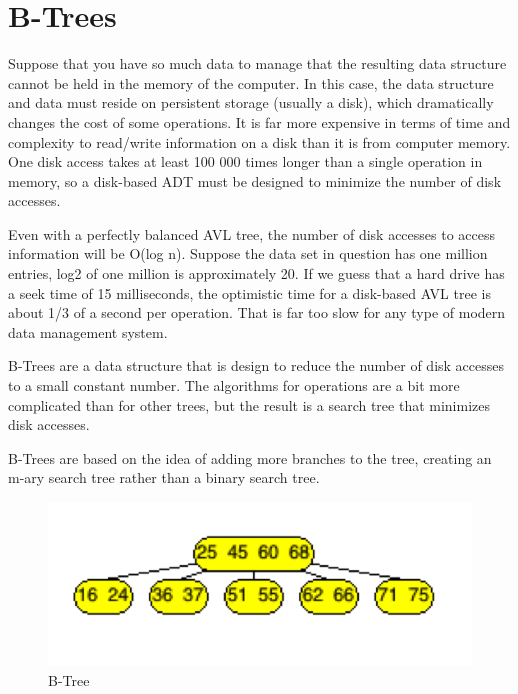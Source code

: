 \section{B-Trees}

Suppose that you have so much data to manage that the resulting data structure cannot be held in the memory of the computer. In this case, the data structure and data must reside on persistent storage (usually a disk), which dramatically changes the cost of some operations. It is far more expensive in terms of time and complexity to read/write information on a disk than it is from computer memory. One disk access takes at least 100 000 times longer than a single operation in memory, so a disk-based ADT must be designed to minimize the number of disk accesses.

Even with a perfectly balanced AVL tree, the number of disk accesses to access information will be O(log n). Suppose the data set in question has one million entries, log2 of one million is approximately 20. If we guess that a hard drive has a seek time of 15 milliseconds, the optimistic time for a disk-based AVL tree is about 1/3 of a second per operation. That is far too slow for any type of modern data management system.

B-Trees are a data structure that is design to reduce the number of disk accesses to a small constant number. The algorithms for operations are a bit more complicated than for other trees, but the result is a search tree that minimizes disk accesses.

B-Trees are based on the idea of adding more branches to the tree, creating an m-ary search tree rather than a binary search tree.

\begin{figure}[H]
\centering
\includegraphics{pictures/tree23.png}
\caption{B-Tree}
\label{fig:tree23}
\end{figure}

